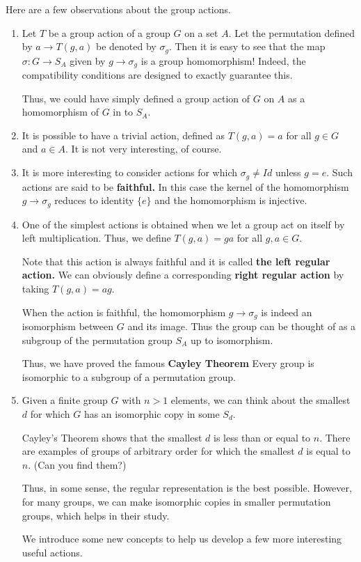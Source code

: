 \documentclass[12pt]{article}
\begin{document}
Here are a few observations about the group actions.
\begin{enumerate}
\item Let $T$ be a group action of a group $G$ on a set $A$.
Let the permutation defined by $a\rightarrow T(g,a)$ be denoted by
$\sigma_g$. Then it is easy to see that the map $\sigma:G \rightarrow
S_A$ given by $g \rightarrow \sigma_g$ is a group homomorphism! Indeed,
the compatibility conditions are designed to exactly guarantee this.

Thus, we could have simply defined  a group action of $G$ on $A$ as a
homomorphism of $G$ in to $S_A$.

\item It is possible to have a trivial action, defined as $T(g,a)=a$
for all $g\in G$ and $a\in A$. It is not very interesting, of course.

\item It is more interesting to consider actions for which $\sigma_g \neq Id$
unless $g=e$. Such actions are said to be {\bf faithful.}
In this case the kernel of the homomorphism $g \rightarrow \sigma_g$ reduces to
identity $\{e\}$ and the homomorphism is injective.


\item One of the simplest actions is obtained when we let a group act on
itself by left multiplication. Thus, we define $T(g,a) = ga$ for all
$g,a\in G$.

Note that this action is always faithful and it is called {\bf the left
regular action.} We can obviously define a corresponding {\bf right
regular action}
by taking $T(g,a)=ag$.


When the action is faithful, the homomorphism $g\rightarrow \sigma_g$
is indeed an isomorphism between $G$ and its image. Thus the group can
be thought of as a subgroup of the permutation group $S_A$ up to
isomorphism.

Thus, we have proved the famous {\bf Cayley Theorem} Every group is
isomorphic to a subgroup of a permutation group.

\item Given a finite group $G$ with $n>1$ elements, we can think about
the smallest $d$ for which $G$ has an isomorphic copy in some $S_d$.

Cayley's Theorem shows that the smallest $d$ is less than or equal to
$n$. There are examples of groups of arbitrary order
for which the smallest $d$ is equal to $n$. (Can you find them?)

Thus, in some sense, the regular representation is the best possible.
However, for many groups, we can make isomorphic copies in smaller
permutation groups, which helps in their study.

We introduce some new concepts to help us develop a few more interesting
useful actions.

\end{enumerate}
\end{document}
